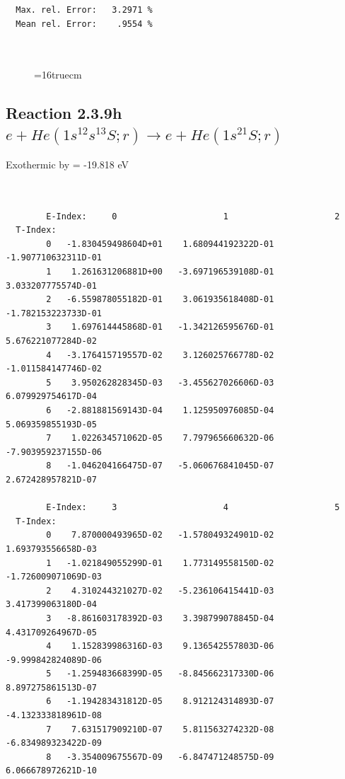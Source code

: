 \documentclass[12pt,dvipdfmx]{article}
\begin{document}
\begin{small}
\begin{verbatim}
  Max. rel. Error:   3.2971 %
  Mean rel. Error:    .9554 %



\end{verbatim}\end{small}
\begin{figure} \label{2.3.9g}
\epsfxsize=16truecm
\end{figure}
\newpage

\subsection{
Reaction 2.3.9h  $e + He(1s^12s^13S;r) \rightarrow e + He(1s^21S;r) $
}
Exothermic by =  -19.818 eV

\begin{small}\begin{verbatim}


        E-Index:     0                     1                     2
  T-Index:
        0   -1.830459498604D+01    1.680944192322D-01   -1.907710632311D-01
        1    1.261631206881D+00   -3.697196539108D-01    3.033207775574D-01
        2   -6.559878055182D-01    3.061935618408D-01   -1.782153223733D-01
        3    1.697614445868D-01   -1.342126595676D-01    5.676221077284D-02
        4   -3.176415719557D-02    3.126025766778D-02   -1.011584147746D-02
        5    3.950262828345D-03   -3.455627026606D-03    6.079929754617D-04
        6   -2.881881569143D-04    1.125950976085D-04    5.069359855193D-05
        7    1.022634571062D-05    7.797965660632D-06   -7.903959237155D-06
        8   -1.046204166475D-07   -5.060676841045D-07    2.672428957821D-07

        E-Index:     3                     4                     5
  T-Index:
        0    7.870000493965D-02   -1.578049324901D-02    1.693793556658D-03
        1   -1.021849055299D-01    1.773149558150D-02   -1.726009071069D-03
        2    4.310244321027D-02   -5.236106415441D-03    3.417399063180D-04
        3   -8.861603178392D-03    3.398799078845D-04    4.431709264967D-05
        4    1.152839986316D-03    9.136542557803D-06   -9.999842824089D-06
        5   -1.259483668399D-05   -8.845662317330D-06    8.897275861513D-07
        6   -1.194283431812D-05    8.912124314893D-07   -4.132333818961D-08
        7    7.631517909210D-07    5.811563274232D-08   -6.834989323422D-09
        8   -3.354009675567D-09   -6.847471248575D-09    6.066678972621D-10


\end{verbatim}
\end{small}
\end{document}
